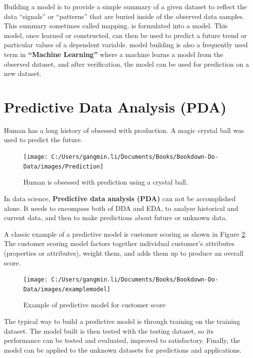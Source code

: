 \documentclass[
]{book}
\begin{document}
Building a model is to provide a simple summary of a given dataset to reflect the data ``signals'' or ``patterns'' that are buried inside of the observed data samples. This summary sometimes called mapping. is formulated into a model. This model, once learned or constructed, can then be used to predict a future trend or particular values of a dependent variable. model building is also a frequently used term in \textbf{``Machine Learning''} where a machine learns a model from the observed dataset, and after verification, the model can be used for prediction on a new dataset.

\hypertarget{predictive-data-analysis-pda}{%
\section{Predictive Data Analysis (PDA)}\label{predictive-data-analysis-pda}}

Human has a long history of obsessed with production. A magic crystal ball was used to predict the future.

\begin{figure}

{\centering \texttt{[image: C:/Users/gangmin.li/Documents/Books/Bookdown-Do-Data/images/Prediction]} 

}

\caption{Human is obsessed with prediction using a crystal ball.}\label{fig:prediction}
\end{figure}

In data science, \textbf{Predictive data analysis (PDA)} can not be accomplished alone. It needs to encompass both of DDA and EDA, to analyse historical and current data, and then to make predictions about future or unknown data.

A classic example of a predictive model is customer scoring as shown in Figure \ref{fig:modelexam}. The customer scoring model factors together individual customer's attributes (properties or attributes), weight them, and adds them up to produce an overall score.

\begin{figure}

{\centering \texttt{[image: C:/Users/gangmin.li/Documents/Books/Bookdown-Do-Data/images/examplemodel]} 

}

\caption{Example of predictive model for customer score}\label{fig:modelexam}
\end{figure}

The typical way to build a predictive model is through training on the training dataset. The model built is then tested with the testing dataset, so its performance can be tested and evaluated, improved to satisfactory. Finally, the model can be applied to the unknown datasets for predictions and applications.
\end{document}

